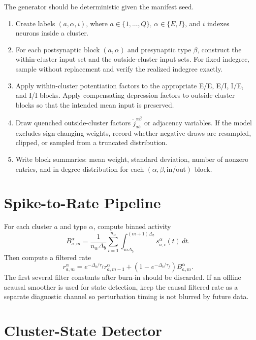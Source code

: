 The generator should be deterministic given the manifest seed.
\begin{enumerate}
    \item Create labels \((a,\alpha,i)\), where \(a\in\{1,\ldots,Q\}\),
    \(\alpha\in\{E,I\}\), and \(i\) indexes neurons inside a cluster.
    \item For each postsynaptic block \((a,\alpha)\) and presynaptic type
    \(\beta\), construct the within-cluster input set and the outside-cluster
    input sets. For fixed indegree, sample without replacement and verify the
    realized indegree exactly.
    \item Apply within-cluster potentiation factors to the appropriate E/E,
    E/I, I/E, and I/I blocks. Apply compensating depression factors to
    outside-cluster blocks so that the intended mean input is preserved.
    \item Draw quenched outside-cluster factors \(\check j_{ab}^{\alpha\beta}\)
    or adjacency variables. If the model excludes sign-changing weights, record
    whether negative draws are resampled, clipped, or sampled from a truncated
    distribution.
    \item Write block summaries: mean weight, standard deviation, number of
    nonzero entries, and in-degree distribution for each
    \((\alpha,\beta,\mathrm{in/out})\) block.
\end{enumerate}

\section{Spike-to-Rate Pipeline}
\label{appC:spike-rate-pipeline}

For each cluster \(a\) and type \(\alpha\), compute binned activity
\[
    B_{a,m}^{\alpha}
    =
    \frac{1}{n_\alpha\Delta_b}
    \sum_{i=1}^{n_\alpha}
    \int_{m\Delta_b}^{(m+1)\Delta_b}s_{a,i}^{\alpha}(t)\,dt .
\]
Then compute a filtered rate
\[
    r_{a,m}^{\alpha}
    =
    e^{-\Delta_b/\tau_f}r_{a,m-1}^{\alpha}
    +
    \left(1-e^{-\Delta_b/\tau_f}\right)B_{a,m}^{\alpha}.
\]
The first several filter constants after burn-in should be discarded. If an
offline acausal smoother is used for state detection, keep the causal filtered
rate as a separate diagnostic channel so perturbation timing is not blurred by
future data.

\section{Cluster-State Detector}
\label{appC:state-detector}

